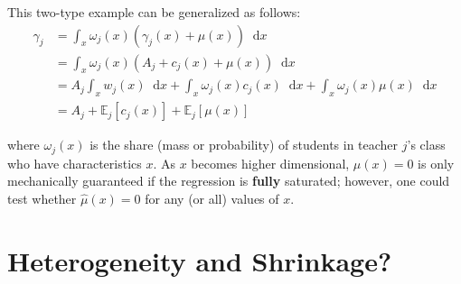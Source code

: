 \documentclass[letterpaper,12pt]{article}
\newcommand*\diff{\mathop{}\!\mathrm{d}}
\begin{document}
This two-type example can be generalized as follows:
\begin{align*}
    \gamma_j  &= \int_x \omega_j(x)(\gamma_j(x) + \mu(x)) \diff x \\
              &= \int_x \omega_j(x)(A_j + c_j(x) + \mu(x)) \diff x \\
              &= A_j \int_x w_j(x) \diff x + \int_x \omega_j(x) c_j(x)\diff x + \int_x \omega_j(x) \mu(x)\diff x \\
              &= A_j  + \mathbb{E}_j[c_j(x)] + \mathbb{E}_j[\mu(x)]
\end{align*}

\noindent where $\omega_j(x)$ is the share (mass or probability) of students in teacher $j$'s class who have characteristics $x$. As $x$ becomes higher dimensional, $\mu(x)=0$ is only mechanically guaranteed if the regression is \textbf{fully} saturated; however, one could test whether $\hat{\mu}(x)=0$ for any (or all) values of $x$.


\section{Heterogeneity and Shrinkage?}


\end{document}
